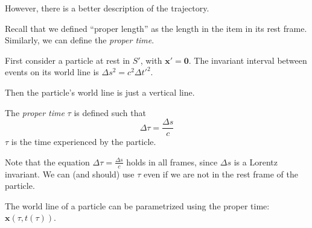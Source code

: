 \documentclass[a4paper]{article}
\begin{document}
However, there is a better description of the trajectory.

Recall that we defined ``proper length'' as the length in the item in its rest frame. Similarly, we can define the \emph{proper time}.

First consider a particle at rest in $S'$, with $\mathbf{x}' = \mathbf{0}$. The invariant interval between events on its world line is $\Delta s^2 = c^2 \Delta t'^2$.

Then the particle's world line is just a vertical line.

\begin{defi}
  The \emph{proper time} $\tau$ is defined such that
  \[
    \Delta \tau = \frac{\Delta s}{c}
  \]
  $\tau$ is the time experienced by the particle.
\end{defi}
Note that the equation $\Delta \tau = \frac{\Delta s}{c}$ holds in all frames, since $\Delta s$ is a Lorentz invariant. We can (and should) use $\tau$ even if we are not in the rest frame of the particle.

The world line of a particle can be parametrized using the proper time: $\mathbf{x}(\tau, t(\tau))$.
\begin{center}
\end{center}
\end{document}
